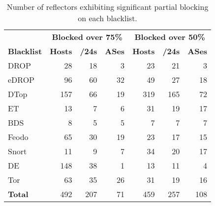 \begin{table}[t]
\centering
\small
\begin{tabular}{l r r r | r r r }
 \toprule
 \textbf{}           &\multicolumn{3}{c}{\textbf{Blocked over 75\%}}    &\multicolumn{3}{c}{\textbf{Blocked over 50\%}} \\
 \textbf{Blacklist}  &\textbf{Hosts}   &\textbf{/24s}   &\textbf{ASes}  &\textbf{Hosts}   &\textbf{/24s}   &\textbf{ASes} \\
 \midrule
 DROP      & 28      & 18     & 3   &  23      & 21    & 3\\
 eDROP     & 96      & 60     & 32  &  49      & 27    & 18\\
 DTop        & 157     & 66     & 19  &  319     & 165   & 72\\
 ET     & 13      & 7      & 6   &  31      & 19    & 17\\
 BDS           & 8       & 5      & 5   &  7       & 7     & 7\\
 Feodo             & 65      & 30     & 19  &  23      & 17    & 15\\
 Snort       & 11      & 9      & 7   &  34      & 20    & 17\\
 DE       & 148     & 38     & 1   &  13      & 11    & 4\\
 Tor             & 63      & 35     & 26  &  31      & 19    & 16\\
 \midrule
 \textbf{Total}              & 492     & 207    & 71  & 459      & 257   & 108\\
 \bottomrule
\end{tabular}
\caption{Number of reflectors exhibiting significant partial blocking on each blacklist.}
\label{tab:partial-blocking-reflectors}
\end{table}

